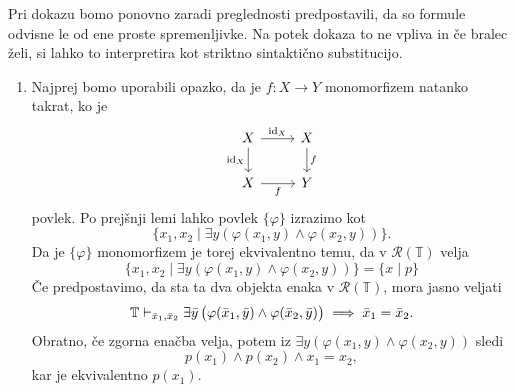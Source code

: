 \documentclass[../kategoricna_logika.tex]{subfiles}
\begin{document}
  \begin{dokaz}
    Pri dokazu bomo ponovno zaradi preglednosti predpostavili,
    da so formule odvisne le od ene proste spremenljivke. Na potek
    dokaza to ne vpliva in če bralec želi, si lahko to interpretira
    kot striktno sintaktično substitucijo.
    \begin{enumerate}[label=(\roman*)]
    \item Najprej bomo uporabili opazko, da je $f : X \to Y$
      monomorfizem natanko takrat, ko je
      \begin{equation*}
        \begin{tikzcd}
          X \ar[d, " \mathrm{id}_X"'] \ar[r, " \mathrm{id}_X"] & X \ar[d, "f"] \\
          X \ar[r, "f"'] & Y
        \end{tikzcd}
      \end{equation*}
      povlek. Po prejšnji lemi lahko povlek $\{\varphi\}$ izrazimo kot
      \[ \{ x_1,x_2 \mid \exists y(\varphi(x_1,y) \land
        \varphi(x_2,y)) \}.\] Da je $\{\varphi\}$ monomorfizem je
      torej ekvivalentno temu, da v $\mathcal{R}(\mathbb{T})$ velja
      \[ \{ x_1,x_2 \mid \exists y(\varphi(x_1,y) \land
        \varphi(x_2,y)) \} = \{x \mid p\} \] Če predpostavimo, da sta
      ta dva objekta enaka v $\mathcal{R}(\mathbb{T})$, mora jasno
      veljati
    $$\mathbb{T} \vdash_{\bar{x}_1,\bar{x}_2}  \exists \bar{y} \left( \varphi(\bar{x}_1,\bar{y}) \wedge \varphi(\bar{x}_2,\bar{y}) \right) \implies \bar{x}_1 = \bar{x}_2 .$$
    Obratno, če zgorna enačba velja, potem iz
    $\exists y(\varphi(x_1,y) \land \varphi(x_2,y))$ sledi
    \[p(x_1) \land p(x_2) \land x_1 = x_2,\]
    kar je ekvivalentno $p(x_1)$.


\end{enumerate}
\end{dokaz}
\end{document}
